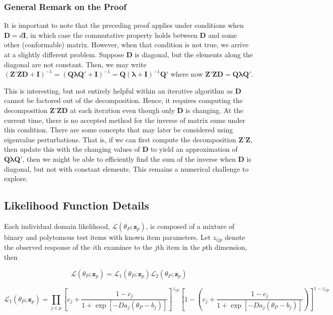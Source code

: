 \documentclass[12pt]{article}
\begin{document}
\subsubsection*{General Remark on the Proof}
It is important to note that the preceding proof applies under conditions when $\bm{D}=d\bm{I}$, in which case the commutative property holds between $\bm{D}$ and some other (conformable) matrix. However, when that condition is not true, we arrive at a slightly different problem. Suppose $\bm{D}$ is diagonal, but the elements along the diagonal are not constant. Then, we may write $(\bm{Z}'\bm{Z}\bm{D} + \bm{I})^{-1} = (\bm{Q} \bm{\lambda} \bm{Q}' + \bm{I})^{-1} = \bm{Q} (\bm{\lambda}+\bm{I})^{-1} \bm{Q}'$ where now $\bm{Z}'\bm{Z}\bm{D} = \bm{Q} \bm{\lambda} \bm{Q}'$.

This is interesting, but not entirely helpful within an iterative algorithm as $\bm{D}$ cannot be factored out of the decomposition. Hence, it requires computing the decomposition $\bm{Z}'\bm{Z}\bm{D}$ at each iteration even though only $\bm{D}$ is changing. At the current time, there is no accepted method for the inverse of matrix sums under this condition. There are some concepts that may later be considered using eigenvalue perturbations. That is, if we can first compute the decomposition $\bm{Z}'\bm{Z}$, then update this with the changing values of $\bm{D}$ to yield an approximation of $\bm{Q} \bm{\lambda} \bm{Q}'$, then we might be able to efficiently find the sum of the inverse when $\bm{D}$ is diagonal, but not with constant elements. This remains a numerical challenge to explore.

\subsection*{Likelihood Function Details}

Each individual domain likelihood, $\mathcal{L}(\theta_P;\bm{z}_p)$, is composed of a mixture of binary and polytomous test items with known item parameters. Let $z_{ijp}$ denote the observed response of the $i$th examinee to the $j$th item in the $p$th dimension, then

\begin{equation}
\mathcal{L}(\theta_P;\bm{z}_p) = \mathcal{L}_1(\theta_P;\bm{z}_p)\mathcal{L}_2(\theta_P;\bm{z}_p)\nonumber
\end{equation}

\begin{equation}
\mathcal{L}_1(\theta_P;\bm{z}_p) = \prod_{j \in p}\left[c_j+\frac{1-c_j}{1+\exp[-Da_j(\theta_P-b_j)]}\right]^{z_{ijp}}\left[1-\left(c_j+\frac{1-c_j}{1+\exp[-Da_j(\theta_P-b_j)]}\right)\right]^{1-z_{ijp}}\nonumber
\end{equation}
\end{document}
